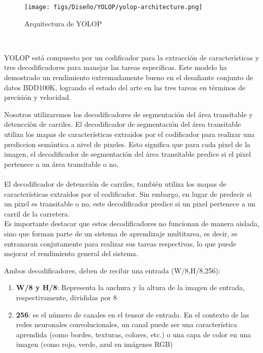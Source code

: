 \begin{figure} [H]
  \begin{center}
    \texttt{[image: figs/Diseño/YOLOP/yolop-architecture.png]}
  \end{center}
  \caption{Arquitectura de YOLOP}
  \label{fig:Arq_YOLOP}
\end{figure}\

YOLOP está compuesto por un codificador para la extracción de características y tres decodificadores para manejar las tareas específicas. Este modelo ha demostrado un rendimiento 
extremadamente bueno en el desafiante conjunto de datos BDD100K, logrando el estado del arte en las tres tareas en términos de precisión y velocidad. \newline

Nosotros utilizaremos los decodificadores de segmentación del área transitable 
y detencción de carriles. El decodificador de segmentación del área transitable utiliza los mapas de características
extraidos por el codificador para realizar una prediccion semántica a nivel de pixeles. Esto significa que 
para cada pixel de la imagen, el decodificador de segmentación del área transitable predice si el pixel 
pertenece a un área transitable o no. 
\\
\\
El decodificador de detencción de carriles, también utiliza los mapas de características extraídos 
por el codificador. Sin embargo, en lugar de predecir si un pixel es transitable o no, este decodificador
predice si un pixel pertenece a un carril de la carretera. 
\\
Es importante destacar que estos decodificadores no funcionan de manera aislada, sino que forman parte
de un sistema de aprendizaje multitarea, es decir, se entranaran conjutamente para realizar sus tareas
respectivas, lo que puede mejorar el rendimiento general del sistema.

Ambos decodificadores, deben de recibir una entrada (W/8,H/8,256): 
\begin{enumerate}
  \item \textbf{W/8 y H/8}: Representa la anchura y la altura de la imagen de entrada, respectivamente, divididas por 8
  \item \textbf{256}: es el número de 
  canales en el tensor de entrada. En el contexto de las redes neuronales convolucionales, 
  un canal puede ser una característica aprendida (como bordes, texturas, colores, etc.) o una capa de color en una imagen (como rojo, verde, azul en imágenes RGB)
\end{enumerate}

